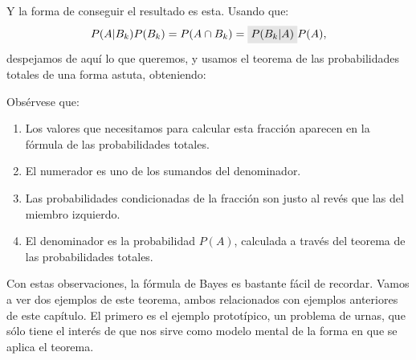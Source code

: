 Y la forma de conseguir el resultado es esta. Usando que:
    \[P(A|B_k)P(B_k)=P(A\cap B_k)=\colorbox{lightgrey}{$P(B_k|A)$}P(A),\]
despejamos de aquí lo que queremos, y usamos el teorema de las probabilidades totales de una forma astuta, obteniendo:
\begin{center}
    \end{center}
Obsérvese que:
    \begin{enumerate}
    \item Los valores que necesitamos para calcular esta fracción aparecen en la fórmula de las probabilidades totales.
    \item El numerador es uno de los sumandos del denominador.
    \item Las probabilidades condicionadas de la fracción son justo al revés que las del miembro izquierdo.
    \item El denominador es la probabilidad $P(A)$, calculada a través del teorema de las probabilidades totales.
    \end{enumerate}
Con estas observaciones, la fórmula de Bayes es bastante fácil de recordar. Vamos a ver dos ejemplos de este teorema, ambos relacionados con ejemplos anteriores de este capítulo.
El primero es el ejemplo prototípico, un problema de urnas, que sólo tiene el interés de que nos sirve como modelo mental de la forma en que se aplica el teorema.

